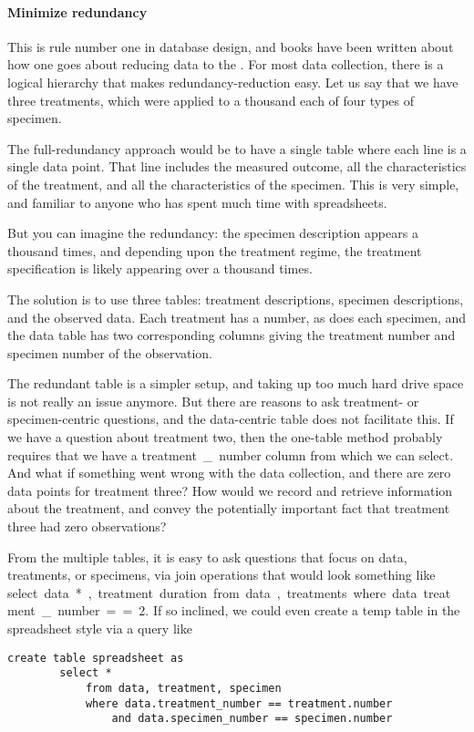 \paragraph{Minimize redundancy} This is rule number one in database
design, and books have been written about how one goes about reducing
data to the . For most data collection, there is a
logical hierarchy that makes redundancy-reduction easy. Let us say that
we have three treatments, which were applied to a thousand each of four
types of specimen.

The full-redundancy approach would be to have a single table where each
line is a single data point.  That line includes the measured outcome,
all the characteristics of the treatment, and all the characteristics
of the specimen.  This is very simple, and familiar to anyone who has
spent much time with spreadsheets.

But you can imagine the redundancy: the specimen description appears a
thousand times, and depending upon the treatment regime, the treatment
specification is likely appearing over a thousand times.

The solution is to use three tables: treatment descriptions, specimen
descriptions, and the observed data. Each treatment has a number, as
does each specimen, and the data table has two corresponding columns
giving the treatment number and specimen number of the observation.

The redundant table is a simpler setup, and taking up too much hard drive
space is not really an issue anymore. But there are reasons to ask
treatment- or specimen-centric questions, and the data-centric table
does not facilitate this. If we have a question about treatment
two, then the one-table method probably requires that we have a
\si{treatment\_number} column from which we can select. And what if
something went wrong with the data collection, and there are zero data
points for treatment three? How would we record and retrieve information
about the treatment, and convey the potentially important fact that
treatment three had zero observations?

From the multiple tables, it is easy to ask questions that focus on
data, treatments, or specimens, via join operations that would look
something like \si{select data.*, treatment.duration from data, treatments
where data.treat\-ment\_number==2}. If so inclined, we could even create
a temp table in the spreadsheet style via a query like 
\begin{lstlisting}
create table spreadsheet as 
        select * 
            from data, treatment, specimen 
            where data.treatment_number == treatment.number 
                and data.specimen_number == specimen.number
\end{lstlisting}

